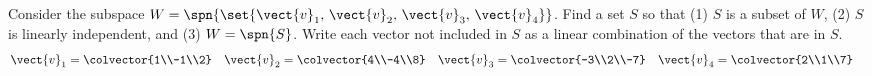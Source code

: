 Consider the subspace
$W=\spn{\set{\vect{v}_1,\,\vect{v}_2,\,\vect{v}_3,\,\vect{v}_4}}$.
Find a set $S$ so that (1)  $S$ is a subset of $W$, (2) $S$ is linearly independent, and (3) $W=\spn{S}$.  Write each vector not included in $S$ as a linear combination of the vectors that are in $S$.
%
\begin{align*}
\vect{v}_1&=\colvector{1\\-1\\2}
&
\vect{v}_2&=\colvector{4\\-4\\8}
&
\vect{v}_3&=\colvector{-3\\2\\-7}
&
\vect{v}_4&=\colvector{2\\1\\7}
\end{align*}

